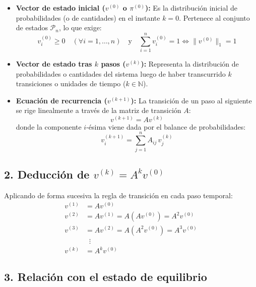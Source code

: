 \documentclass[11pt,a4paper]{article}
\theoremstyle{definition}
\begin{document}
\begin{itemize}
    \item \textbf{Vector de estado inicial ($v^{(0)}$ o $\pi^{(0)}$):} 
    Es la distribución inicial de probabilidades (o de cantidades) en el instante $k = 0$. Pertenece al conjunto de estados $\mathcal{P}_n$, lo que exige:
    \[
    v_i^{(0)} \ge 0 \quad (\forall i = 1, \dots, n) \quad \text{y} \quad \sum_{i=1}^n v_i^{(0)} = 1 \iff \|v^{(0)}\|_1 = 1
    \]

    \item \textbf{Vector de estado tras $k$ pasos ($v^{(k)}$):} 
    Representa la distribución de probabilidades o cantidades del sistema luego de haber transcurrido $k$ transiciones o unidades de tiempo ($k \in \mathbb{N}$).

    \item \textbf{Ecuación de recurrencia ($v^{(k+1)}$):} 
    La transición de un paso al siguiente se rige linealmente a través de la matriz de transición $A$:
    \[
    v^{(k+1)} = A v^{(k)}
    \]
    donde la componente $i$-ésima viene dada por el balance de probabilidades:
    \[
    v_i^{(k+1)} = \sum_{j=1}^n A_{ij} \, v_j^{(k)}
    \]
\end{itemize}

\subsection*{2. Deducción de $v^{(k)} = A^k v^{(0)}$}

Aplicando de forma sucesiva la regla de transición en cada paso temporal:
\begin{align*}
    v^{(1)} &= A v^{(0)} \\
    v^{(2)} &= A v^{(1)} = A \left( A v^{(0)} \right) = A^2 v^{(0)} \\
    v^{(3)} &= A v^{(2)} = A \left( A^2 v^{(0)} \right) = A^3 v^{(0)} \\
    &\;\;\vdots \\
    v^{(k)} &= A^k v^{(0)}
\end{align*}

\subsection*{3. Relación con el estado de equilibrio}
\end{document}
